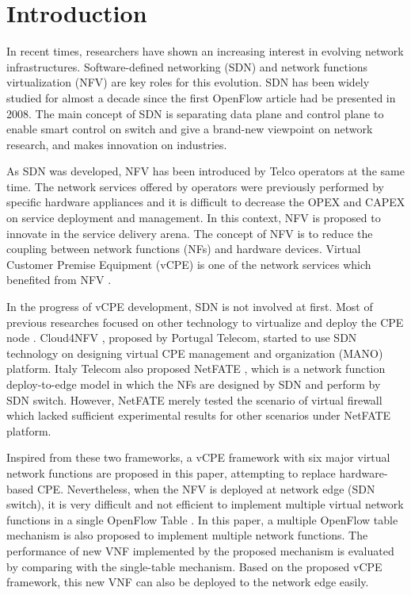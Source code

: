\documentclass[conference]{IEEEtran}
\begin{document}
\section{Introduction}
In recent times, researchers have shown an increasing interest in evolving network infrastructures.
Software-defined networking (SDN) and network functions virtualization (NFV) are key roles for this evolution.
SDN \cite{sdn-mckeown-2009-talk, sdn-newnorm, sdn-road, sdn-compre-survey} has been widely studied for almost a decade since the first OpenFlow \cite{openflow-mckeown-2008, openflow-spec} article had be presented in 2008.
The main concept of SDN is separating data plane and control plane to enable smart control on switch and give a brand-new viewpoint on network research, and makes innovation on industries.

As SDN was developed, NFV \cite{nfv-wp, etsi-nfv-archi, nfv-survey} has been introduced by Telco operators at the same time.
The network services offered by operators were previously performed by specific hardware appliances and it is difficult to decrease the OPEX and CAPEX on service deployment and management.
In this context, NFV is proposed to innovate in the service delivery arena.
The concept of NFV is to reduce the coupling between network functions (NFs) and hardware devices.
Virtual Customer Premise Equipment (vCPE) \cite{nec-vcpe, vcpe-enhance} is one of the network services which benefited from NFV \cite{etsi-nfv-usecase}.

In the progress of vCPE development, SDN is not involved at first.
Most of previous researches focused on other technology to virtualize and deploy the CPE node \cite{virtual-rg, security-vgw, design-vrgw, nfv-hgw-surrogate, linux-cpe, nfv-resoure-contrain-cpe}.
Cloud4NFV \cite{cloud4nfv, cloud4nfv-telco}, proposed by Portugal Telecom, started to use SDN technology on designing virtual CPE management and organization (MANO) platform.
Italy Telecom also proposed NetFATE \cite{netfate}, which is a network function deploy-to-edge model in which the NFs are designed by SDN and perform by SDN switch. However, NetFATE merely tested the scenario of virtual firewall which lacked sufficient experimental results for other scenarios under NetFATE platform.

Inspired from these two frameworks, a vCPE framework with six major virtual network functions are proposed in this paper, attempting to replace hardware-based CPE.
Nevertheless, when the NFV is deployed at network edge (SDN switch), it is very difficult and not efficient to implement multiple virtual network functions in a single OpenFlow Table \cite{multiple-flow-table}. In this paper, a multiple OpenFlow table mechanism is also proposed to implement multiple network functions. The performance of new VNF implemented by the proposed mechanism is evaluated by comparing with the single-table mechanism. Based on the proposed vCPE framework, this new VNF can also be deployed to the network edge easily.
\end{document}
